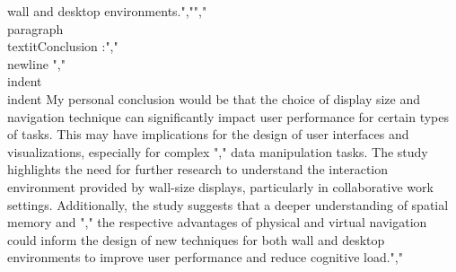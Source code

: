 wall and desktop environments.","","        \\paragraph{ \\textit{Conclusion :}","                \\newline }","        \\indent \\indent My personal conclusion would be that the choice of display size and navigation technique can significantly impact user performance for certain types of tasks. This may have implications for the design of user interfaces and visualizations, especially for complex ","        data manipulation tasks. The study highlights the need for further research to understand the interaction environment provided by wall-size displays, particularly in collaborative work settings. Additionally, the study suggests that a deeper understanding of spatial memory and ","        the respective advantages of physical and virtual navigation could inform the design of new techniques for both wall and desktop environments to improve user performance and reduce cognitive load.","    